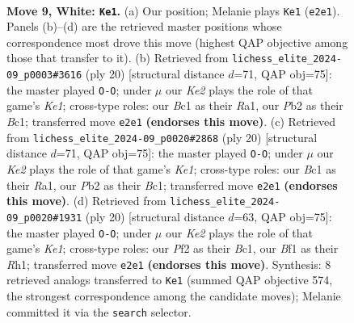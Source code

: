 \documentclass[11pt]{article}
\begin{document}
\begin{figure}[p]\centering
\begin{subfigure}{0.46\textwidth}\centering
\resizebox{\linewidth}{!}{%
\newchessgame
\chessboard[
  setfen={r1bqkb1r/1p2pppp/pnnp4/4P3/3P4/5NP1/PP2KP1P/RNBQ1B1R w kq - 0 9},
  showmover=false,
  pgfstyle=straightmove, color=movearrow, markmove={e2-e1}
]}
\caption{}
\end{subfigure}\hfill
\begin{subfigure}{0.46\textwidth}\centering
\resizebox{\linewidth}{!}{%
\newchessgame
\chessboard[
  setfen={r1b2rk1/ppq2ppp/2n1pn2/2p5/3P4/P1PBP3/4NPPP/R1BQK2R w KQ - 4 11},
  showmover=false,
  pgfstyle=straightmove, color=movearrow, markmove={e1-g1}
]}
\caption{}
\end{subfigure}
\\[4pt]
\begin{subfigure}{0.46\textwidth}\centering
\resizebox{\linewidth}{!}{%
\newchessgame
\chessboard[
  setfen={r1b2rk1/ppq2ppp/2n1pn2/2p5/3P4/P1PBP3/4NPPP/R1BQK2R w KQ - 4 11},
  showmover=false,
  pgfstyle=straightmove, color=movearrow, markmove={e1-g1}
]}
\caption{}
\end{subfigure}\hfill
\begin{subfigure}{0.46\textwidth}\centering
\resizebox{\linewidth}{!}{%
\newchessgame
\chessboard[
  setfen={r1b2rk1/ppq2ppp/2n1pn2/2p5/3P4/P1P1P3/B3NPPP/R1BQK2R w KQ - 4 11},
  showmover=false,
  pgfstyle=straightmove, color=movearrow, markmove={e1-g1}
]}
\caption{}
\end{subfigure}
\caption{\textbf{Move 9, White: \texttt{Ke1}.} (a) Our position; Melanie plays \texttt{Ke1} (\texttt{e2e1}). Panels (b)--(d) are the retrieved master positions whose correspondence most drove this move (highest QAP objective among those that transfer to it). (b) Retrieved from \texttt{lichess\_elite\_2024-09\_p0003\#3616} (ply 20) [structural distance $d$=71, QAP obj=75]: the master played \texttt{O-O}; under $\mu$ our \emph{Ke2} plays the role of that game's \emph{Ke1}; cross-type roles: our \emph{B}c1 as their \emph{R}a1, our \emph{P}b2 as their \emph{B}c1; transferred move \texttt{e2e1} \textbf{(endorses this move)}. (c) Retrieved from \texttt{lichess\_elite\_2024-09\_p0020\#2868} (ply 20) [structural distance $d$=71, QAP obj=75]: the master played \texttt{O-O}; under $\mu$ our \emph{Ke2} plays the role of that game's \emph{Ke1}; cross-type roles: our \emph{B}c1 as their \emph{R}a1, our \emph{P}b2 as their \emph{B}c1; transferred move \texttt{e2e1} \textbf{(endorses this move)}. (d) Retrieved from \texttt{lichess\_elite\_2024-09\_p0020\#1931} (ply 20) [structural distance $d$=63, QAP obj=75]: the master played \texttt{O-O}; under $\mu$ our \emph{Ke2} plays the role of that game's \emph{Ke1}; cross-type roles: our \emph{P}f2 as their \emph{B}c1, our \emph{B}f1 as their \emph{R}h1; transferred move \texttt{e2e1} \textbf{(endorses this move)}. Synthesis: 8 retrieved analogs transferred to \texttt{Ke1} (summed QAP objective 574, the strongest correspondence among the candidate moves); Melanie committed it via the \texttt{search} selector.}
\label{fig:thought-m16}
\end{figure}
\end{document}
